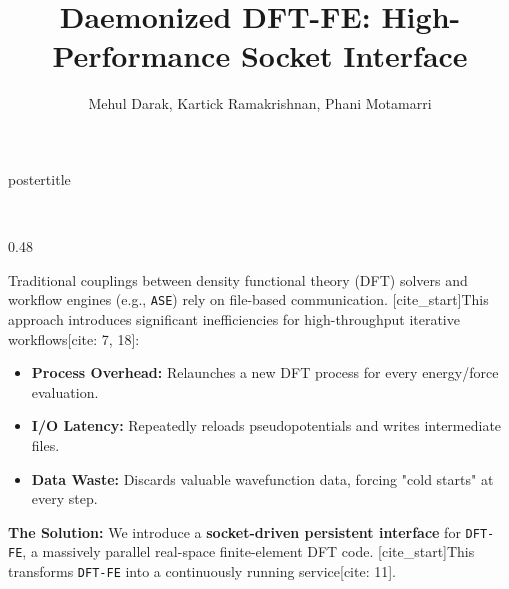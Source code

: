 \documentclass[serif,mathserif,final]{beamer}
\title{\Huge \textbf{Daemonized DFT-FE: High-Performance Socket Interface}}
\author{\Large Mehul Darak, Kartick Ramakrishnan, Phani Motamarri}
\institute{\Large Department of Computational and Data Sciences, Indian Institute of Science, Bengaluru, India}
\newcommand{\DFTFE}{\texttt{DFT-FE}}
\newcommand{\ASE}{\texttt{ASE}}
\begin{document}
\begin{frame}[t]
    \begin{beamercolorbox}[sep=1em,center,wd=\paperwidth]{postertitle}
        \\[0.5em]
        \\[0.3em]
    \end{beamercolorbox}
    \vspace{1cm}

    \begin{columns}[t]

        \begin{column}{0.48\paperwidth}

            \begin{tcolorbox}[title=Motivation: The I/O Bottleneck]
                \justifying
                Traditional couplings between density functional theory (DFT) solvers and workflow engines (e.g., \ASE{}) rely on file-based communication. [cite_start]This approach introduces significant inefficiencies for high-throughput iterative workflows[cite: 7, 18]:
                \begin{itemize}
                    \item \textbf{Process Overhead:} Relaunches a new DFT process for every energy/force evaluation.
                    \item \textbf{I/O Latency:} Repeatedly reloads pseudopotentials and writes intermediate files.
                    \item \textbf{Data Waste:} Discards valuable wavefunction data, forcing "cold starts" at every step.
                \end{itemize}
                
                \textbf{The Solution:} We introduce a \textbf{socket-driven persistent interface} for \DFTFE{}, a massively parallel real-space finite-element DFT code. [cite_start]This transforms \DFTFE{} into a continuously running service[cite: 11].
            \end{tcolorbox}
            \vspace{1em}


\end{column}
\end{columns}
\end{frame}
\end{document}
